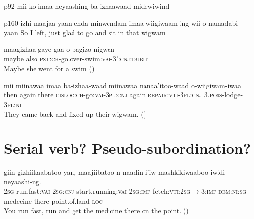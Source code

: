 \documentclass[oldfontcommands,oneside,a4paper,11pt]{article}
\begin{document}
p92 mii ko imaa neyaashing ba-izhaawaad midewiwind

p160 
izhi-maajaa-yaan enda-minwendam imaa wiigiwaam-ing wii-o-namadabi-yaan
So I left, just glad to go and sit in that wigwam

\begin{exe}
\ex 
\gll
maagizhaa gaye gaa-o-bagizo-nigwen \\
maybe also \textsc{pst:ch}-go.over-swim:\textsc{vai}-\textsc{3':cnj:dubit} \\
\glt Maybe she went for a swim (\citealt[74]{kegg93portage})
\end{exe}
\begin{exe}
\ex 
\gll
mii miinawaa imaa ba-izhaa-waad miinawaa nanaa'itoo-waad o-wiigiwam-iwaa \\
then again there \textsc{cisloc:ch}-go:\textsc{vai}-\textsc{3pl:cnj} again \textsc{repair:vti}-\textsc{3pl:cnj} \textsc{3.poss}-lodge-\textsc{3pl:ni} \\
\glt They came back and fixed up their wigwam. (\citealt[32]{kegg93portage})
\end{exe}


\section{Serial verb? Pseudo-subordination?}
\begin{exe}
\ex 
\gll giin  gizhiikaabatoo-yan, maajiibatoo-n naadin i'iw mashkikiwaaboo iwidi neyaashi-ng. \\
 \textsc{2sg} run.fast:\textsc{vai}-\textsc{2sg:cnj} start.running:\textsc{vai}-\textsc{2sg:imp} fetch:\textsc{vti}:\textsc{2sg$\rightarrow$3:imp} \textsc{dem:ni:sg} medecine there point.of.land-\textsc{loc} \\
\glt You run fast, run and get the medicine there on the point. (\citealt[96]{kegg93portage})
\end{exe}




 
\end{document}
